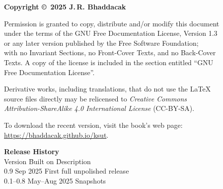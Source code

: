 \thispagestyle{empty}
{\footnotesize
\noindent\textbf{Copyright \copyright\ 2025 J.\,R. Bhaddacak}

\parskip=3mm
\noindent 
Permission is granted to copy, distribute and/or modify this document\\
under the terms of the GNU Free Documentation License, Version 1.3\\
or any later version published by the Free Software Foundation;\\
with no Invariant Sections, no Front-Cover Texts, and no Back-Cover\\
Texts.  A copy of the license is included in the section entitled ``GNU\\
Free Documentation License''.

\parskip=3mm
\noindent 
Derivative works, including translations, that do not use the \LaTeX\\
source files directly may be relicensed to \emph{Creative Commons\\
Attribution-ShareAlike 4.0 International License} (CC-BY-SA).

\parskip=3mm
\noindent 
To download the recent version, visit the book's web page:\\
\url{https://bhaddacak.github.io/ksut}.

\begin{tabbing}
\textbf{Release History}\\
Version \hspace{4mm} \= Built on \hspace{15mm} \= Description\\
0.9  Sep 2025 \> First full unpolished release \\
0.1--0.8 \>  May--Aug 2025 \> Snapshots \\
\end{tabbing}
}
